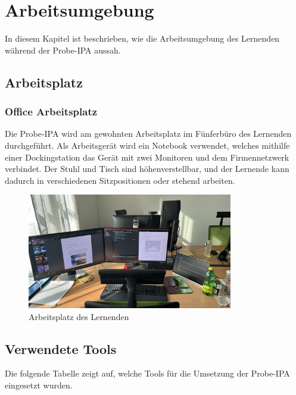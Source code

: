 \chapter{Arbeitsumgebung}\label{ch:arbeitsumgebung}
In diesem Kapitel ist beschrieben, wie die Arbeitsumgebung des Lernenden während der Probe-IPA aussah.


\section{Arbeitsplatz}\label{sec:arbeitsplatz}
\subsection{Office Arbeitsplatz}\label{subsec:office-arbeitsplatz}
Die Probe-IPA wird am gewohnten Arbeitsplatz im Fünferbüro des Lernenden durchgeführt. Als Arbeitsgerät wird ein Notebook verwendet, welches mithilfe einer Dockingstation das Gerät mit zwei Monitoren und dem Firmennetzwerk verbindet. Der Stuhl und Tisch sind höhenverstellbar, und der Lernende kann dadurch in verschiedenen Sitzpositionen oder stehend arbeiten.

\begin{figure}[H]
    \begin{center}
        \includegraphics[width=0.8\textwidth]{ressourcen/Arbeitsplatz-Joel-Vontobel}
        \caption[Arbeitsplatz des Lernenden]{Arbeitsplatz des Lernenden}\label{fig:Arbeitsplatz-Joel-Vontobel}
    \end{center}
\end{figure}

\newpage
\section{Verwendete Tools}\label{sec:verwendete-tools}
Die folgende Tabelle zeigt auf, welche Tools für die Umsetzung der Probe-IPA eingesetzt wurden.

